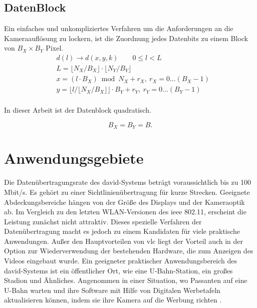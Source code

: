\subsection{DatenBlock}

Ein einfaches und unkompliziertes Verfahren um die Anforderungen an die Kameraauflösung zu lockern, ist die Zuordnung jedes Datenbits zu einem Block von $B_X \times B_Y$ Pixel.
\begin{equation}
\begin{split}
  & d(l)\rightarrow d(x,y,k) \qquad 0\le l <L \\
  & L=\lfloor N_X/B_X \rfloor \cdot \lfloor N_Y/B_Y \rfloor \\
  & x=(l \cdot B_X) \bmod N_X +r_X, \ r_X =0...(B_X -1) \\
  & y=\lfloor l / \lfloor N_X/B_X \rfloor \rfloor \cdot B_Y +r_Y, \ r_Y =0...(B_Y -1) \\
\end{split}
\end{equation}

%

In dieser Arbeit ist der Datenblock quadratisch.

\begin{equation}
   B_X = B_Y = B.
\end{equation}


\section{Anwendungsgebiete} 

Die Datenübertragungsrate des \gls{david}-Systems beträgt voraussichtlich bis zu 100 Mbit/s. Es gehört zu einer Sichtlinienübertragung für kurze Strecken. Geeignete Abdeckungsbereiche hängen von der Größe des Displays und der Kameraoptik ab. Im Vergleich zu den letzten WLAN-Versionen des \gls{ieee} 802.11, erscheint die Leistung zunächst nicht attraktiv. Dieses spezielle Verfahren der Datenübertragung macht es jedoch zu einem Kandidaten für viele praktische Anwendungen. Außer den Hauptvorteilen von \gls{vlc} liegt der Vorteil auch in der Option zur Wiederverwendung der bestehenden Hardware, die zum Anzeigen des Videos eingebaut wurde. Ein geeigneter praktischer Anwendungsbereich des \gls{david}-Systems ist ein öffentlicher Ort, wie eine U-Bahn-Station, ein großes Stadion und Ähnliches. Angenommen in einer Situation, wo Passanten auf eine U-Bahn warten und ihre Software mit Hilfe von Digitalen Werbetafeln aktualisieren können, indem sie ihre Kamera auf die Werbung richten \cite{Kays201502}.

